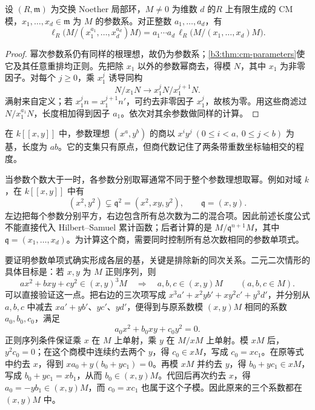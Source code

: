 \begin{proposition}\label{b3:prop:cm-parameter-powers-length}
	设 \((R,\mathfrak m)\) 为交换 Noether 局部环，\(M\ne0\) 为维数 \(d\) 的\(R\) 上有限生成的 CM 模，\(x_1,\ldots,x_d\in\mathfrak m\) 为 \(M\) 的参数系。对正整数 \(a_1,\ldots,a_d\)，有
	\[
		\ell_R\bigl(M/(x_1^{a_1},\ldots,x_d^{a_d})M\bigr) =a_1\cdots a_d\,\ell_R\bigl(M/(x_1,\ldots,x_d)M\bigr).
	\]
\end{proposition}
\begin{proof}
	幂次参数系仍有同样的根理想，故仍为参数系；\cref{b3:thm:cm-parameters}使它及其任意重排均正则。先把除 \(x_1\) 以外的参数幂商去，得模 \(N\)，其中 \(x_1\) 为非零因子。对每个 \(j\ge0\)，乘 \(x_1^j\) 诱导同构
	\[
		N/x_1N\longrightarrow x_1^jN/x_1^{j+1}N.
	\]
	满射来自定义；若 \(x_1^jn=x_1^{j+1}n'\)，可约去非零因子 \(x_1^j\)，故核为零。用这些商滤过 \(N/x_1^{a_1}N\)，长度相加得到因子 \(a_1\)。依次对其余参数做同样的计算。
\end{proof}

在 \(k[\![x,y]\!]\) 中，参数理想 \((x^a,y^b)\) 的商以 \(x^iy^j\ (0\le i<a,\ 0\le j<b)\) 为基，长度为 \(ab\)。它的支集只有原点，但商代数记住了两条带重数坐标轴相交的程度。

\ProseParagraphBreak
当参数个数大于一时，各参数分别取幂通常不同于整个参数理想取幂。例如对域 \(k\)，在 \(k[\![x,y]\!]\) 中有
\[
	(x^2,y^2)\subsetneq\mathfrak q^2=(x^2,xy,y^2), \qquad \mathfrak q=(x,y).
\]
左边把每个参数分别平方，右边包含所有总次数为二的混合项。因此前述长度公式不能直接代入 Hilbert–Samuel 累计函数；后者计算的是 \(M/\mathfrak q^{n+1}M\)，其中 \(\mathfrak q=(x_1,\ldots,x_d)\)。为计算这个商，需要同时控制所有总次数相同的参数单项式。

要证明参数单项式确实形成各层的基，关键是排除新的同次关系。二元二次情形的具体目标是：若 \(x,y\) 为 \(M\) 正则序列，则
\[
	ax^2+bxy+cy^2\in(x,y)^3M \quad\Longrightarrow\quad a,b,c\in(x,y)M \qquad(a,b,c\in M).
\]
可以直接验证这一点。把右边的三次项写成 \(x^3a'+x^2yb'+xy^2c'+y^3d'\)，并分别从 \(a,b,c\) 中减去 \(xa'+yb'\)、\(yc'\)、\(yd'\)，便得到与原系数模 \((x,y)M\) 相同的系数 \(a_0,b_0,c_0\)，满足
\[
	a_0x^2+b_0xy+c_0y^2=0.
\]
正则序列条件保证乘 \(x\) 在 \(M\) 上单射，乘 \(y\) 在 \(M/xM\) 上单射。模 \(xM\) 后，\(y^2c_0=0\)；在这个商模中连续约去两个 \(y\)，得 \(c_0\in xM\)，写成 \(c_0=xc_1\)。在原等式中约去 \(x\)，得到 \(xa_0+y(b_0+yc_1)=0\)。再模 \(xM\) 并约去 \(y\)，得 \(b_0+yc_1\in xM\)，写成 \(b_0+yc_1=xb_1\)，从而 \(b_0\in(x,y)M\)。代回后再次约去 \(x\)，得 \(a_0=-yb_1\in(x,y)M\)，而 \(c_0=xc_1\) 也属于这个子模。因此原来的三个系数都在 \((x,y)M\) 中。

